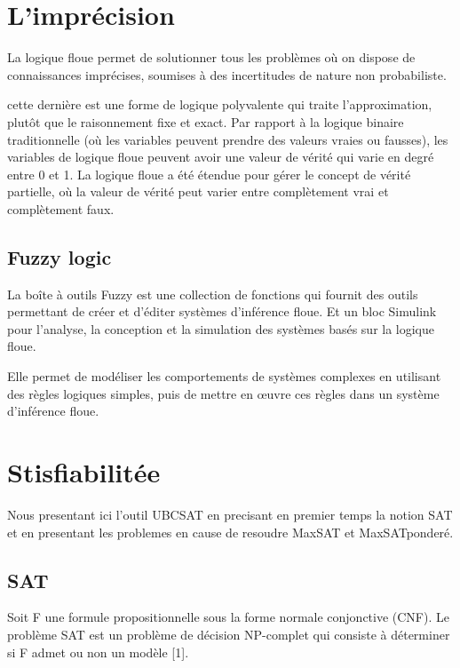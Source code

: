 \section{L’imprécision}

La logique floue permet de solutionner tous les problèmes où on dispose de connaissances imprécises, soumises à des incertitudes de nature non probabiliste.

cette dernière est une forme de logique polyvalente qui traite l’approximation, plutôt que le raisonnement fixe et exact. Par rapport à la logique binaire traditionnelle (où les variables peuvent prendre des valeurs vraies ou fausses), les variables de logique floue peuvent avoir une valeur de vérité qui varie en degré entre 0 et 1. La logique floue a été étendue pour gérer le concept de vérité partielle, où la valeur de vérité peut varier entre complètement vrai et complètement faux. 
\subsection{Fuzzy logic}

La boîte à outils  Fuzzy est une collection de fonctions qui fournit des outils permettant de créer et d'éditer systèmes d'inférence floue. Et un bloc Simulink pour l'analyse, la conception et la simulation des systèmes basés sur la logique floue.

Elle permet de modéliser les comportements de systèmes complexes en utilisant des règles logiques simples, puis de mettre en œuvre ces règles dans un système d'inférence floue.

\section{Stisfiabilitée}

Nous presentant ici l'outil UBCSAT en precisant en premier temps la notion SAT et en presentant les problemes en cause de resoudre MaxSAT et MaxSATponderé. 
\subsection{SAT}
Soit F une formule propositionnelle sous la forme normale conjonctive (CNF). Le problème SAT est un problème de décision NP-complet qui consiste à déterminer si F admet ou non un modèle [1].

